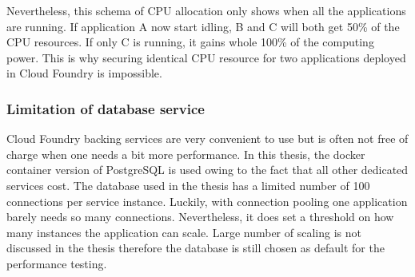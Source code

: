 Nevertheless, this schema of CPU allocation only shows when all the applications are running. If application A now start idling, B and C will both get 50\% of the CPU resources. If only C is running, it gains whole 100\% of the computing power. This is why securing identical CPU resource for two applications deployed in Cloud Foundry is impossible.\\
\subsubsection{Limitation of database service}
Cloud Foundry backing services are very convenient to use but is often not free of charge when one needs a bit more performance. In this thesis, the docker container version of PostgreSQL is used owing to the fact that all other dedicated services cost. The database used in the thesis has a limited number of 100 connections per service instance. Luckily,  with connection pooling one application barely needs so many connections. Nevertheless, it does set a threshold on how many instances the application can scale. Large number of scaling is not discussed in the thesis therefore the database is still chosen as default for the performance testing. \\

